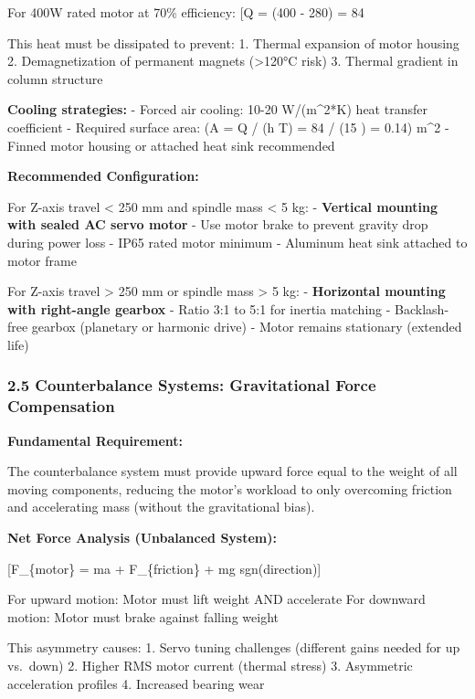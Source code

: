 \documentclass[
]{article}
\begin{document}
For 400W rated motor at 70\% efficiency: {[}Q = (400 - 280)  =
84 \text{ W continuous}{]}

This heat must be dissipated to prevent: 1. Thermal expansion of motor
housing 2. Demagnetization of permanent magnets (\textgreater120°C risk)
3. Thermal gradient in column structure

\textbf{Cooling strategies:} - Forced air cooling: 10-20 W/(m\^{}2*K)
heat transfer coefficient - Required surface area: (A = Q / (h
\times \Delta T) = 84 / (15 ) = 0.14) m\^{}2 - Finned motor
housing or attached heat sink recommended

\textbf{Recommended Configuration:}

For Z-axis travel \textless{} 250 mm and spindle mass \textless{} 5 kg:
- \textbf{Vertical mounting with sealed AC servo motor} - Use motor
brake to prevent gravity drop during power loss - IP65 rated motor
minimum - Aluminum heat sink attached to motor frame

For Z-axis travel \textgreater{} 250 mm or spindle mass \textgreater{} 5
kg: - \textbf{Horizontal mounting with right-angle gearbox} - Ratio 3:1
to 5:1 for inertia matching - Backlash-free gearbox (planetary or
harmonic drive) - Motor remains stationary (extended life)

\subsubsection{2.5 Counterbalance Systems: Gravitational Force
Compensation}\label{counterbalance-systems-gravitational-force-compensation}

\textbf{Fundamental Requirement:}

The counterbalance system must provide upward force equal to the weight
of all moving components, reducing the motor's workload to only
overcoming friction and accelerating mass (without the gravitational
bias).

\textbf{Net Force Analysis (Unbalanced System):}

{[}F\_\{motor\} = ma + F\_\{friction\} + mg \cdot sgn(direction){]}

For upward motion: Motor must lift weight AND accelerate For downward
motion: Motor must brake against falling weight

This asymmetry causes: 1. Servo tuning challenges (different gains
needed for up vs.~down) 2. Higher RMS motor current (thermal stress) 3.
Asymmetric acceleration profiles 4. Increased bearing wear
\end{document}
